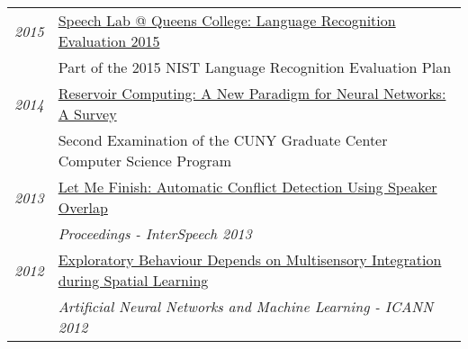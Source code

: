 \documentclass[a4paper,10pt]{article}
\begin{document}
\begin{tabular}{rp{15.5cm}}
        \emph{2015} & \href{https://grezesf.github.io/papers/2015_LRE15.pdf}{Speech Lab @ Queens College: Language Recognition Evaluation 2015} \\
        & \small{Part of the 2015 NIST Language Recognition Evaluation Plan}
        \vspace{0.15cm} \\

        \emph{2014} & \href{https://grezesf.github.io/papers/2014_09_04_Second_Exam_Survey_Felix_Grezes.pdf}{Reservoir Computing: A New Paradigm for Neural Networks: A Survey}\\
        & \small{Second Examination of the CUNY Graduate Center Computer Science Program}
        \vspace{0.15cm} \\

        \emph{2013} & \href{https://grezesf.github.io/papers/2013-03_LetMeFinish.pdf}{Let Me Finish: Automatic Conflict Detection Using Speaker Overlap}\\
        & \small{{\em Proceedings - InterSpeech 2013}}
        \vspace{0.15cm} \\

        \emph{2012} & \href{https://grezesf.github.io/papers/2012-Exploratory_Behaviour_Depends_on_Multisensory_Integration_during_Spatial_Learning.pdf}{Exploratory Behaviour Depends on Multisensory Integration during Spatial Learning}\\
        & \small{{\em Artificial Neural Networks and Machine Learning - ICANN 2012}}
    \end{tabular}\\

\end{document}
